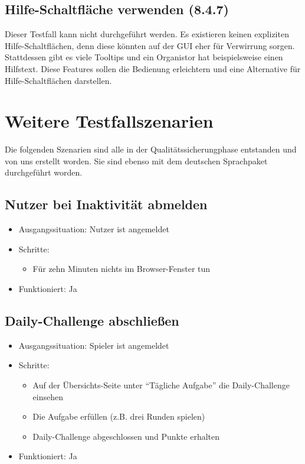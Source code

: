 \documentclass[a4paper]{scrreprt}
\begin{document}
            \subsection{Hilfe-Schaltfläche verwenden (8.4.7)}
            Dieser Testfall kann nicht durchgeführt werden. Es existieren keinen expliziten Hilfe-Schaltflächen, denn diese könnten auf der GUI eher für Verwirrung sorgen.
            Stattdessen gibt es viele Tooltips und ein Organistor hat beispielsweise einen Hilfstext. Diese Features sollen die Bedienung erleichtern und eine Alternative für Hilfe-Schaltflächen darstellen.



        \section{Weitere Testfallszenarien}
        Die folgenden Szenarien sind alle in der Qualitätssicherungphase entstanden und von uns erstellt worden. Sie sind ebenso mit dem deutschen Sprachpaket durchgeführt worden.

            \subsection{Nutzer bei Inaktivität abmelden}
            \begin{itemize}
                \item Ausgangssituation: Nutzer ist angemeldet
                \item Schritte:
                    \begin{itemize}
                        \item Für zehn Minuten nichts im Browser-Fenster tun
                    \end{itemize}
                \item Funktioniert: Ja
            \end{itemize}

            \subsection{Daily-Challenge abschließen}
            \begin{itemize}
                \item Ausgangssituation: Spieler ist angemeldet
                \item Schritte:
                    \begin{itemize}
                        \item Auf der Übersichts-Seite unter \enquote{Tägliche Aufgabe} die Daily-Challenge einsehen
                        \item Die Aufgabe erfüllen (z.B. drei Runden spielen)
                        \item Daily-Challenge abgeschlossen und Punkte erhalten
                    \end{itemize}
                \item Funktioniert: Ja
            \end{itemize}
\end{document}
